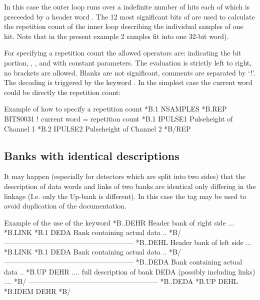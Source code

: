 In this case the outer loop runs over a indefinite number  of
hits each of which is preceeded by a header word .
The 12 most significant bits of 
are used to calculate the repetition count of the inner loop describing
the individual samples of one hit.
Note that in the present example 2 samples fit into one 32-bit word).
 
 
For specifying a repetition count the allowed operators are:
 indicating the bit portion, \Lit{+}, \Lit{-}, \Lit{/} and
\Lit{*} with constant parameters.
The evaluation is strictly left to right, no brackets are allowed.
Blanks are not significant, comments are separated by `!'.
The decoding is triggered by the keyword .
In the simplest case the current word could be directly the repetition
count:
 
\begin{XMPt}{Example of how to specify a repetition count}
*B.1     NSAMPLES
*B.REP   BITS0031      ! current word = repetition count
*B.1     IPULSE1        Pulseheight of Channel 1
*B.2     IPULSE2        Pulseheight of Channel 2
*B/REP
\end{XMPt}
 
\subsection{Banks with identical descriptions}
 
It may happen (especially for detectors which are split into two
sides) that the description of data words and links of two banks are
identical only differing in the linkage 
(I.e. only the Up-bank is different).
In this case the tag  may be used to avoid
duplication of the documentation.
 
\begin{XMPt}{Example of the use of the  keyword}
  *B..DEHR   Header bank of right side
  ...
  *B.LINK
  *B.1    DEDA   Bank containing actual data
  ..
  *B/
  --------------------------------------------------------
  *B..DEHL   Header bank of left side
  ...
  *B.LINK
  *B.1    DEDA   Bank containing actual data
  ..
  *B/
  --------------------------------------------------------
  *B..DEDA  Bank containing actual data
  ..
  *B.UP    DEHR
  ....
  full description of bank DEDA (possibly including links)
  ....
  *B/
  --------------------------------------------------------
  *B..DEDA
  *B.UP      DEHL
  *B.IDEM    DEHR
  *B/
\end{XMPt}
 
